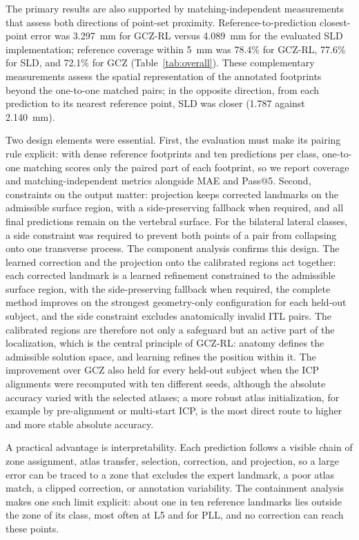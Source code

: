 \documentclass[5p,times,twocolumn,authoryear]{elsarticle}
\newif\ifhighlight
\newcommand{\rev}[1]{\ifhighlight{\color{revcolor}#1}\else#1\fi}
\newcommand{\revstart}{\ifhighlight\begingroup\color{revcolor}\fi}
\newcommand{\revend}{\ifhighlight\par\endgroup\fi}
\begin{document}
\revstart
The primary results are also supported by matching-independent measurements that assess both directions of point-set proximity. Reference-to-prediction closest-point error was 3.297~mm for GCZ-RL versus 4.089~mm for the evaluated SLD implementation; reference coverage within 5~mm was 78.4\% for GCZ-RL, 77.6\% for SLD, and 72.1\% for GCZ (Table~\ref{tab:overall}). These complementary measurements assess the spatial representation of the annotated footprints beyond the one-to-one matched pairs; in the opposite direction, from each prediction to its nearest reference point, SLD was closer (1.787 against 2.140~mm).
\revend

Two design elements were essential. First, the evaluation must make its pairing rule explicit: with dense reference footprints and ten predictions per class, one-to-one matching scores only the paired part of each footprint, so we report coverage and matching-independent metrics alongside MAE and Pass@5. Second, constraints on the output matter: \rev{projection keeps corrected landmarks on the admissible surface region, with a side-preserving fallback when required, and all final predictions remain on the vertebral surface. For the bilateral lateral classes,} a side constraint was required to prevent both points of a pair from collapsing onto one transverse process. \rev{The component analysis confirms this design. The learned correction and the projection onto the calibrated regions act together: each corrected landmark is a learned refinement constrained to the admissible surface region, with the side-preserving fallback when required, the complete method improves on the strongest geometry-only configuration for each held-out subject, and the side constraint excludes anatomically invalid ITL pairs. The calibrated regions are therefore not only a safeguard but an active part of the localization, which is the central principle of GCZ-RL: anatomy defines the admissible solution space, and learning refines the position within it. The improvement over GCZ also held for every held-out subject when the ICP alignments were recomputed with ten different seeds, although the absolute accuracy varied with the selected atlases; a more robust atlas initialization, for example by pre-alignment or multi-start ICP, is the most direct route to higher and more stable absolute accuracy.}

A practical advantage is interpretability. Each prediction follows a visible chain of zone assignment, atlas transfer, selection, correction, and projection, so a large error can be traced to a zone that excludes the expert landmark, a poor atlas match, a clipped correction, or annotation variability. The containment analysis makes one such limit explicit: about one in ten reference landmarks lies outside the zone of its class, most often at L5 and for PLL, and no correction can reach these points.
\end{document}
